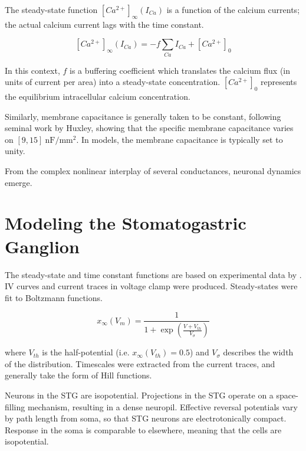 The steady-state function $\left[ Ca^{2+} \right]_\infty (I_{Ca})$ is a function of the calcium currents; the actual calcium current lags with the time constant.

\begin{equation}
	\left[ Ca^{2+} \right]_\infty (I_{Ca}) = - f \sum_{Ca} I_{Ca} + \left[ Ca^{2+} \right]_0
\end{equation}

In this context, $f$ is a buffering coefficient which translates the calcium flux (in units of current per area) into a steady-state concentration. $\left[ Ca^{2+} \right]_0$ represents the equilibrium intracellular calcium concentration. 
 
Similarly, membrane capacitance is generally taken to be constant, following seminal work by Huxley, showing that the specific membrane capacitance varies on $[9, 15]\ \mathrm{nF/mm^2}$. In models, the membrane capacitance is typically set to unity\autocite{Liumodelneuronactivitydependent1998,PrinzAlternativehandtuningconductancebased2003,PrinzSimilarnetworkactivity2004,OLearyCellTypesNetwork2014}.

From the complex nonlinear interplay of several conductances, neuronal dynamics emerge.

\section{Modeling the Stomatogastric Ganglion}
The steady-state and time constant functions are based on experimental data by \autocite{TurrigianoSelectiveregulationcurrent1995}. IV curves and current traces in voltage clamp were produced. Steady-states were fit to Boltzmann functions.

\[ x_\infty(V_m) = \frac{1}{1 + \exp \left( \frac{V+V_{th}}{V_\sigma} \right)} \]

where $V_{th}$ is the half-potential (i.e. $x_\infty(V_{th}) = 0.5$) and $V_\sigma$ describes the width of the distribution. Timescales were extracted from the current traces, and generally take the form of Hill functions.

Neurons in the \acs{STG} are isopotential. Projections in the \acs{STG} operate on a space-filling mechanism, resulting in a dense neuropil\autocite{CuntzOnerulegrow2010}. Effective reversal potentials vary by path length from soma, so that \acs{STG} neurons are electrotonically compact\autocite{OtopalikSloppymorphologicaltuning2017}. Response in the soma is comparable to elsewhere, meaning that the cells are isopotential. 

